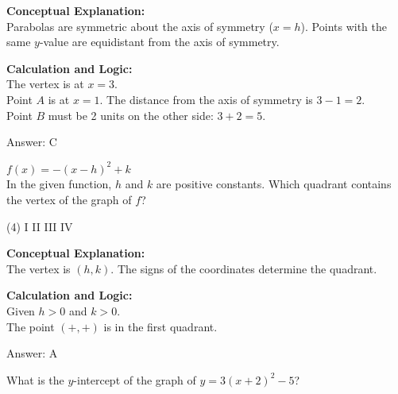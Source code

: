 \documentclass[11pt,paper=a4,answers]{exam}
\begin{document}
\begin{questions}
\begin{solution}
\textbf{Conceptual Explanation:} \\
Parabolas are symmetric about the axis of symmetry ($x=h$). Points with the same $y$-value are equidistant from the axis of symmetry.

\vspace{20pt}

\textbf{Calculation and Logic:} \\
The vertex is at $x=3$. \\
Point $A$ is at $x=1$. The distance from the axis of symmetry is $3 - 1 = 2$. \\
Point $B$ must be 2 units on the other side: $3 + 2 = 5$.

\vspace{25pt}

Answer: \colorbox{yellow!100}{C}
\end{solution}

\vspace{40pt}

\question
$f(x) = -(x-h)^2 + k$ \\
In the given function, $h$ and $k$ are positive constants. Which quadrant contains the vertex of the graph of $f$?
\begin{tasks}(4)
    \task I
    \task II
    \task III
    \task IV
\end{tasks}

\begin{solution}
\textbf{Conceptual Explanation:} \\
The vertex is $(h, k)$. The signs of the coordinates determine the quadrant.

\vspace{20pt}

\textbf{Calculation and Logic:} \\
Given $h > 0$ and $k > 0$. \\
The point $(+, +)$ is in the first quadrant.

\vspace{25pt}

Answer: \colorbox{yellow!100}{A}
\end{solution}

\vspace{40pt}

\question
What is the $y$-intercept of the graph of $y = 3(x+2)^2 - 5$?


\end{questions}
\end{document}
